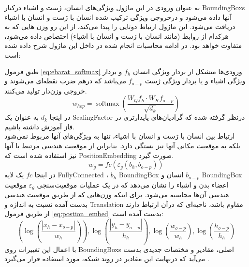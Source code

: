  به عنوان ورودی در این ماژول ویژگی‌های انسان، ژست و اشیاء درکنار 
 \glspl{BoundingBox}
 آنها داده می‌شود و درخروجی ویژگی ترکیب شده انسان با ژست و انسان با اشیاء دریافت می‌شود. این ماژول ارتباط دوتایی را پیدا می‌کند،‌ از این رو وزن هایی که به هرکدام از روابط (مانند انسان با ژست و انسان با اشیاء) اختصاص داده می‌شود، متفاوت خواهد بود. در ادامه محاسبات انجام شده در داخل این ماژول شرح داده شده است:
 
 طبق فرمول %
 \ref{eq:ebarat_softmax}
  ورودی‌ها متشکل از بردار ویژگی انسان %
  $f_h$
   و بردار ویژگی اشیاء و یا بردار ویژگی ژست %
    $f_{o-p}$ 
    می‌باشد که درهم ضرب نقطه‌ای می‌شوند و خروجی وزن‌دار تولید می‌کنند.
 \begin{equation}
 	\label{eq:ebarat_softmax}
 	w_{hop}=\operatorname{softmax}\left(\frac{W_Q f_h \cdot W_K f_{o-p}}{\sqrt{d_k}}\right)
 \end{equation}
 در اینجا %
 $d_k$
 به عنوان یک %
\gls{ScalingFactor}
درنظر گرفته شده که گرادیان‌های پایدارتری در فاز آموزش داشته باشیم. \\
ارتباط بین انسان با ژست و انسان با اشیاء، تنها به ویژگی‌های آنها مربوط نمی‌شود بلکه به موقعیت مکانی آنها نیز بستگی دارد. بنابراین از موقعیت هندسی مرتبط با آنها نیز استفاده شده است که %
\gls{PositionEmbedding}
 صورت گیرد.
\begin{equation}
	\label{eq:scaling_factor}
	w_g=f c\left(\varepsilon_g\left(b_h, b_{o-p}\right)\right)
\end{equation}
 در اینجا %
 $f c$
 یک لایه %
\gls{FullyConnected}
،‌ %
 $b_h$
 \gls{BoundingBox}
  انسان و %
 $b_{o-p}$
 \gls{BoundingBox}
 اعضاء بدن و اشیاء را نشان می‌دهد که در یک عملیات موقعیت‌سنجی   %
 $\varepsilon_g$
 موقعیت هندسی آن‌ها محاسبه می‌شود. برای اینکه وزن‌هایی که از طریق موقعیت هندسی بدست آمده نسبت به اندازه و %
\gls{Translation}
  مقاوم باشد، ناحیه‌ای که درآن ارتباط دارند از طریق فرمول %
  \ref{eq:postion_embed}
   بدست آمده است:
\begin{equation}
	\label{eq:postion_embed}
	\left(\log \left(\frac{\left|x_h-x_{o-p}\right|}{w_h}\right)\right), \log \left(\frac{\left|y_h-y_{o-p}\right|}{h_h}\right), \log \left(\frac{w_{o-p}}{w_h}\right), \log \left(\frac{h_{o-p}}{h_h}\right)
\end{equation}
با اعمال این تغییرات روی 
 \glspl{BoundingBox}
 اصلی، مقادیر و مختصات جدیدی بدست ‌می‌آید که درنهایت این مقادیر در روند شبکه، مورد استفاده قرار می‌گیرد 
\cite{Relation_network_object}
.
 
